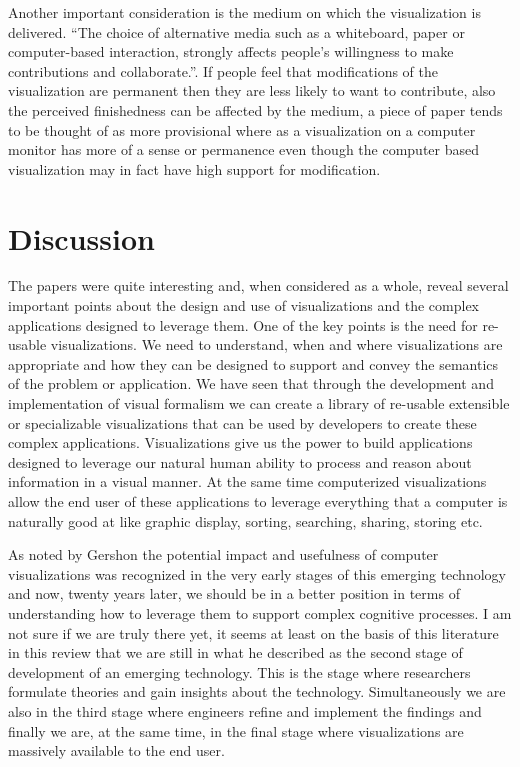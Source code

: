 \documentclass{sig-alternate}
\begin{document}
Another important consideration is the medium on which the visualization is
delivered.  ``The choice of alternative media such as a whiteboard, paper or
computer-based interaction, strongly affects people's willingness to make
contributions and
collaborate.''\cite{Bresciani:ACollaborativeDimensionsFramework}. If people
feel that modifications of the visualization are permanent then they are less
likely to want to contribute, also the perceived finishedness can be affected
by the medium, a piece of paper tends to be thought of as more provisional
where as a visualization on a computer monitor has more of a sense or
permanence even though the computer based visualization may in fact have high
support for modification.


\section{Discussion}
The papers were quite interesting and, when considered as a whole, reveal
several important points about the design and use of visualizations and the
complex applications designed to leverage them. One of the key points is the
need for re-usable visualizations. We need to understand, when and where
visualizations are appropriate and how they can be designed to support and
convey the semantics of the problem or application. We have seen that through
the development and implementation of visual formalism we can create a library
of re-usable extensible or specializable visualizations that can be used by
developers to create these complex applications. Visualizations give us the
power to build applications designed to leverage our natural human ability to
process and reason about information in a visual manner. At the same time
computerized visualizations allow the end user of these applications to leverage
everything that a computer is naturally good at like graphic display, sorting,
searching, sharing, storing etc.

As noted by Gershon \cite{Gershon:1998:Informationvisualization} the potential
impact and usefulness of computer visualizations was recognized in the very
early stages of this emerging technology and now, twenty years later, we should
be in a better position in terms of understanding how to leverage them
to support complex cognitive processes. I am not sure if we are truly there yet,
it seems at least on the basis of this literature in this review that we are still in
what he described as the second stage of development of an emerging technology.
This is the stage where researchers formulate theories and gain insights about
the technology. Simultaneously we are also in the third stage where
engineers refine and implement the findings and finally we are, at the same time, in the
final stage where visualizations are massively available to the end user.
\end{document}
